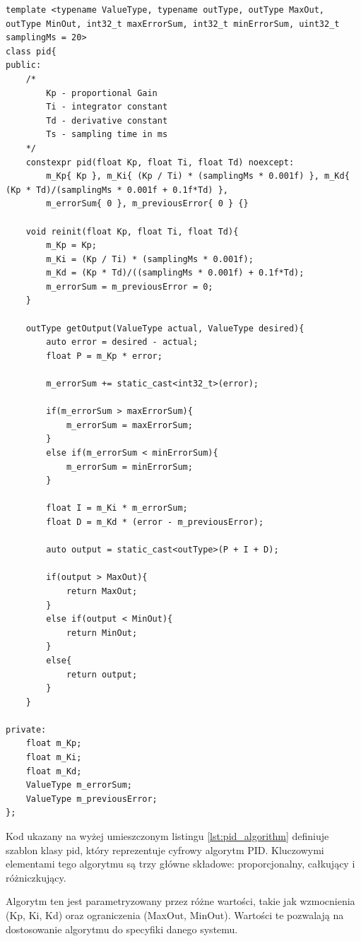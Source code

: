 \documentclass[12pt,twoside]{article}
\begin{document}
\begin{lstlisting}[caption={Kod implementacji cyfrowego algorytmu PID}, label={lst:pid_algorithm}]
template <typename ValueType, typename outType, outType MaxOut, outType MinOut, int32_t maxErrorSum, int32_t minErrorSum, uint32_t samplingMs = 20>
class pid{
public:
    /*
        Kp - proportional Gain
        Ti - integrator constant
        Td - derivative constant
        Ts - sampling time in ms
    */
    constexpr pid(float Kp, float Ti, float Td) noexcept:
        m_Kp{ Kp }, m_Ki{ (Kp / Ti) * (samplingMs * 0.001f) }, m_Kd{ (Kp * Td)/(samplingMs * 0.001f + 0.1f*Td) },
        m_errorSum{ 0 }, m_previousError{ 0 } {}
    
    void reinit(float Kp, float Ti, float Td){
        m_Kp = Kp;
        m_Ki = (Kp / Ti) * (samplingMs * 0.001f);
        m_Kd = (Kp * Td)/((samplingMs * 0.001f) + 0.1f*Td);
        m_errorSum = m_previousError = 0;
    }

    outType getOutput(ValueType actual, ValueType desired){
        auto error = desired - actual;
        float P = m_Kp * error;
        
        m_errorSum += static_cast<int32_t>(error);

        if(m_errorSum > maxErrorSum){
            m_errorSum = maxErrorSum;
        }
        else if(m_errorSum < minErrorSum){
            m_errorSum = minErrorSum; 
        }

        float I = m_Ki * m_errorSum;
        float D = m_Kd * (error - m_previousError);

        auto output = static_cast<outType>(P + I + D);

        if(output > MaxOut){
            return MaxOut;
        }
        else if(output < MinOut){
            return MinOut;
        }
        else{
            return output;
        }
    }

private:
    float m_Kp;
    float m_Ki;
    float m_Kd;
    ValueType m_errorSum;
    ValueType m_previousError;
};
\end{lstlisting}

Kod ukazany na wyżej umieszczonym listingu \ref{lst:pid_algorithm} definiuje szablon klasy pid, który reprezentuje cyfrowy algorytm PID. Kluczowymi elementami tego algorytmu są trzy główne składowe: proporcjonalny, całkujący i różniczkujący.

Algorytm ten jest parametryzowany przez różne wartości, takie jak wzmocnienia (Kp, Ki, Kd) oraz ograniczenia (MaxOut, MinOut). Wartości te pozwalają na dostosowanie algorytmu do specyfiki danego systemu.
\end{document}
